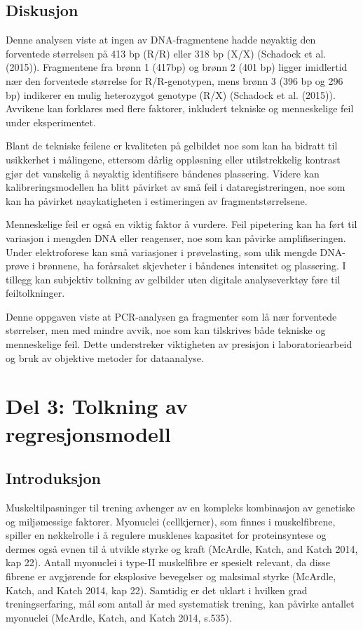 \documentclass[
  letterpaper,
  DIV=11,
  numbers=noendperiod]{scrreprt}
\begin{document}
\subsection{Diskusjon}\label{diskusjon-1}

Denne analysen viste at ingen av DNA-fragmentene hadde nøyaktig den
forventede størrelsen på 413 bp (R/R) eller 318 bp (X/X) (Schadock et
al. (2015)). Fragmentene fra brønn 1 (417bp) og brønn 2 (401 bp) ligger
imidlertid nær den forventede størrelse for R/R-genotypen, mens brønn 3
(396 bp og 296 bp) indikerer en mulig heterozygot genotype (R/X)
(Schadock et al. (2015)). Avvikene kan forklares med flere faktorer,
inkludert tekniske og menneskelige feil under eksperimentet.

Blant de tekniske feilene er kvaliteten på gelbildet noe som kan ha
bidratt til usikkerhet i målingene, ettersom dårlig oppløsning eller
utilstrekkelig kontrast gjør det vanskelig å nøyaktig identifisere
båndenes plassering. Videre kan kalibreringsmodellen ha blitt påvirket
av små feil i dataregistreringen, noe som kan ha påvirket nøaykatigheten
i estimeringen av fragmentstørrelsene.

Menneskelige feil er også en viktig faktor å vurdere. Feil pipetering
kan ha ført til variasjon i mengden DNA eller reagenser, noe som kan
påvirke amplifiseringen. Under elektroforese kan små variasjoner i
prøvelasting, som ulik mengde DNA-prøve i brønnene, ha forårsaket
skjevheter i båndenes intensitet og plassering. I tillegg kan subjektiv
tolkning av gelbilder uten digitale analyseverktøy føre til
feiltolkninger.

Denne oppgaven viste at PCR-analysen ga fragmenter som lå nær forventede
størrelser, men med mindre avvik, noe som kan tilskrives både tekniske
og menneskelige feil. Dette understreker viktigheten av presisjon i
laboratoriearbeid og bruk av objektive metoder for dataanalyse.

\section{Del 3: Tolkning av
regresjonsmodell}\label{del-3-tolkning-av-regresjonsmodell}

\subsection{Introduksjon}\label{introduksjon-3}

Muskeltilpasninger til trening avhenger av en kompleks kombinasjon av
genetiske og miljømessige faktorer. Myonuclei (cellkjerner), som finnes
i muskelfibrene, spiller en nøkkelrolle i å regulere musklenes kapasitet
for proteinsyntese og dermes også evnen til å utvikle styrke og kraft
(McArdle, Katch, and Katch 2014, kap 22). Antall myonuclei i type-II
muskelfibre er spesielt relevant, da disse fibrene er avgjørende for
eksplosive bevegelser og maksimal styrke (McArdle, Katch, and Katch
2014, kap 22). Samtidig er det uklart i hvilken grad treningserfaring,
mål som antall år med systematisk trening, kan påvirke antallet
myonuclei (McArdle, Katch, and Katch 2014, s.535).
\end{document}
